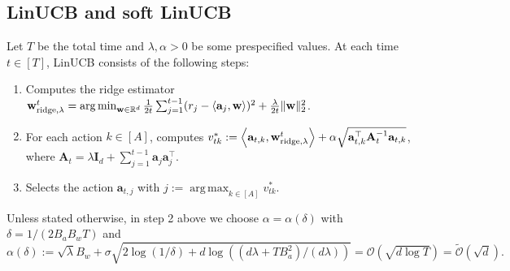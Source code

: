 \documentclass[10pt]{article}
\newcommand{\id}{\bI}
\DeclareMathOperator*{\argmin}{arg\,min}
\DeclareMathOperator*{\argmax}{arg\,max}
\renewcommand{\cO}{\mathcal{O}}
\newcommand{\<}{\left\langle}
\renewcommand{\>}{\right\rangle}
\newcommand{\bzero}{{\mathbf 0}}
\newcommand{\ridge}{{\rm ridge}}
\newcommand{\R}{\mathbb{R}}
\newcommand{\pre}{{\mathrm{pre}}}
\newcommand{\post}{{\mathrm{post}}}
\newcommand{\parta}{{a}}
\newcommand{\partb}{{b}}
\newcommand{\partc}{{c}}
\newcommand{\partd}{{d}}
\newcommand{\temp}{{\tau}}
\newcommand{\cwid}{{\alpha}}  %
\newcommand{\tcO}{{\tilde{\mathcal O}}}
\newcommand{\totlen}{{T}} %
\def\bA{{\mathbf A}}
\def\bH{{\mathbf H}}
\def\bI{{\mathbf I}}
\def\ba{{\mathbf a}}
\def\bh{{\mathbf h}}
\def\bp{{\mathbf p}}
\def\bw{{\mathbf w}}
\begin{document}








\subsection{LinUCB and soft LinUCB}\label{sec:soft-LinUCB}
Let $T$ be the total time and $\lambda,\cwid>0$ be some prespecified values. At each time $t\in[T]$, LinUCB consists of the following steps: 
\begin{enumerate}
    \item Computes the ridge estimator $\bw^t_{\ridge,\lambda}=\argmin_{\bw\in\R^d}\frac{1}{2t}\sum_{j=1}^{t-1}(r_j-\<\ba_j,\bw\>)^2+\frac{\lambda}{2t}\|\bw\|_2^2$.
    \item For each action $k\in[A]$, computes $v^*_{tk}:=\<\ba_{t,k},\bw^t_{\ridge,\lambda}\>+\cwid\sqrt{\ba_{t,k}^\top \bA_{t}^{-1}  \ba_{t,k}}$, where $\bA_t=\lambda\id_d+\sum_{j=1}^{t-1}\ba_j\ba_j^\top$.
    \item Selects the action $\ba_{t,j}$ with $j:=\argmax_{k\in[A]}v^*_{tk}$.
\end{enumerate}
Unless stated otherwise, in step 2 above we choose $\alpha=\alpha(\delta)$ with $\delta=1/(2B_aB_wT)$ and $$\cwid(\delta):=\sqrt{\lambda}B_w+\sigma\sqrt{2\log(1/\delta)+d\log((d\lambda+TB_a^2)/(d\lambda))}=\cO(\sqrt{d\log \totlen})=\tcO(\sqrt{d}).$$
\end{document}
